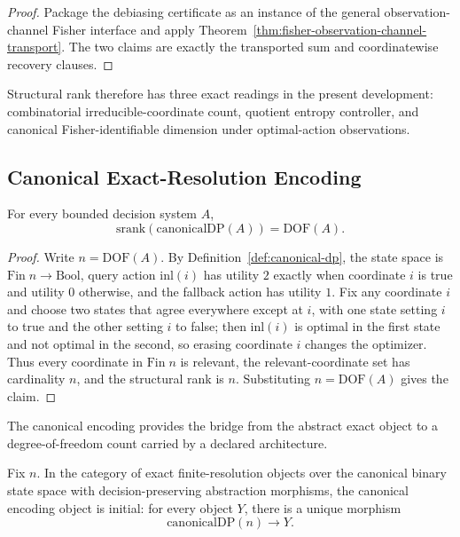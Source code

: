 \begin{proof}
Package the debiasing certificate as an instance of the general observation-channel Fisher interface and apply Theorem~\ref{thm:fisher-observation-channel-transport}. The two claims are exactly the transported sum and coordinatewise recovery clauses.
\end{proof}

Structural rank therefore has three exact readings in the present development: combinatorial irreducible-coordinate count, quotient entropy controller, and canonical Fisher-identifiable dimension under optimal-action observations.

\subsection{Canonical Exact-Resolution Encoding}

\begin{theorem}\label{thm:dof-srank}
For every bounded decision system $A$,
\[
\mathrm{srank}(\mathrm{canonicalDP}(A)) = \mathrm{DOF}(A).
\]
\end{theorem}

\begin{proof}
Write $n = \mathrm{DOF}(A)$. By Definition~\ref{def:canonical-dp}, the state space is $\mathrm{Fin}\;n \to \mathrm{Bool}$, query action $\mathrm{inl}(i)$ has utility $2$ exactly when coordinate $i$ is true and utility $0$ otherwise, and the fallback action has utility $1$. Fix any coordinate $i$ and choose two states that agree everywhere except at $i$, with one state setting $i$ to true and the other setting $i$ to false; then $\mathrm{inl}(i)$ is optimal in the first state and not optimal in the second, so erasing coordinate $i$ changes the optimizer. Thus every coordinate in $\mathrm{Fin}\;n$ is relevant, the relevant-coordinate set has cardinality $n$, and the structural rank is $n$. Substituting $n = \mathrm{DOF}(A)$ gives the claim.
\end{proof}

The canonical encoding provides the bridge from the abstract exact object to a degree-of-freedom count carried by a declared architecture.

\begin{theorem}\label{thm:canonical-initiality}
Fix $n$. In the category of exact finite-resolution objects over the canonical binary state space with decision-preserving abstraction morphisms, the canonical encoding object is initial: for every object $Y$, there is a unique morphism
\[
\mathrm{canonicalDP}(n) \longrightarrow Y.
\]
\end{theorem}

